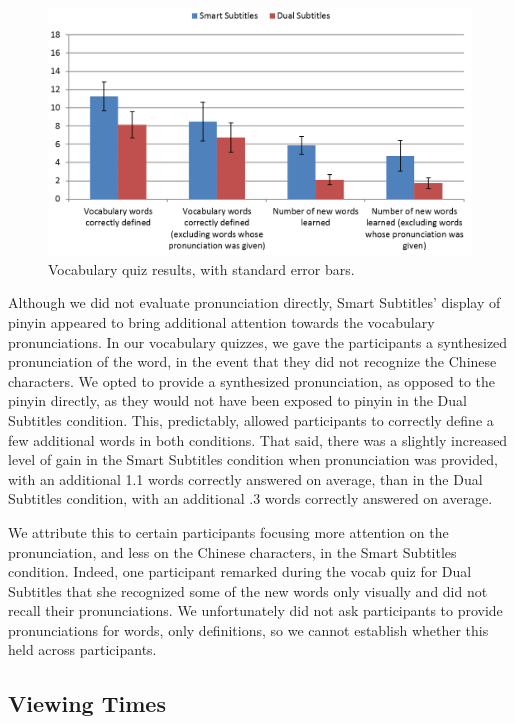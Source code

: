 \documentclass{sigchi}
\begin{document}
\begin{figure}[!h]
\centering
\includegraphics[width=\columnwidth]{vocab-quiz-results}
\caption{Vocabulary quiz results, with standard error bars.}
\label{fig:figure6}
\end{figure}

Although we did not evaluate pronunciation directly, Smart Subtitles' display of pinyin appeared to bring additional attention towards the vocabulary pronunciations. In our vocabulary quizzes, we gave the participants a synthesized pronunciation of the word, in the event that they did not recognize the Chinese characters. We opted to provide a synthesized pronunciation, as opposed to the pinyin directly, as they would not have been exposed to pinyin in the Dual Subtitles condition. This, predictably, allowed participants to correctly define a few additional words in both conditions. That said, there was a slightly increased level of gain in the Smart Subtitles condition when pronunciation was provided, with an additional 1.1 words correctly answered on average, than in the Dual Subtitles condition, with an additional .3 words correctly answered on average.

We attribute this to certain participants focusing more attention on the pronunciation, and less on the Chinese characters, in the Smart Subtitles condition. Indeed, one participant remarked during the vocab quiz for Dual Subtitles that she recognized some of the new words only visually and did not recall their pronunciations. We unfortunately did not ask participants to provide pronunciations for words, only definitions, so we cannot establish whether this held across participants.

\subsection{Viewing Times}
\end{document}
